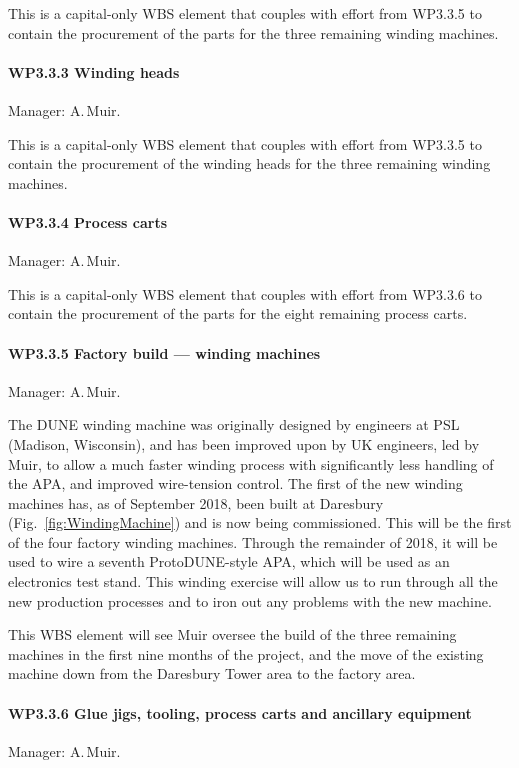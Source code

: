 This is a capital-only WBS element that couples with effort from WP3.3.5 to contain the procurement of the parts for the three remaining winding machines.

\paragraph{WP3.3.3 Winding heads} Manager: A.\,Muir.

This is a capital-only WBS element that couples with effort from WP3.3.5 to contain the procurement of the winding heads for the three remaining winding machines.

\paragraph{WP3.3.4 Process carts} Manager: A.\,Muir.

This is a capital-only WBS element that couples with effort from WP3.3.6 to contain the procurement of the parts for the eight remaining process carts.

\paragraph{WP3.3.5 Factory build --- winding machines} Manager: A.\,Muir.

The DUNE winding machine was originally designed by engineers at PSL (Madison, Wisconsin), and has been improved upon by UK engineers, led by Muir, to allow a much faster winding process with significantly less handling of the APA, and improved wire-tension control. The first of the new winding machines has, as of September 2018, been built at Daresbury (Fig.~\ref{fig:WindingMachine}) and is now being commissioned. This will be the first of the four factory winding machines. Through the remainder of 2018, it will be used to wire a seventh ProtoDUNE-style APA, which will be used as an electronics test stand. This winding exercise will allow us to run through all the new production processes and to iron out any problems with the new machine.

This WBS element will see Muir oversee the build of the three remaining machines in the first nine months of the project, and the move of the existing machine down from the Daresbury Tower area to the factory area.

\paragraph{WP3.3.6 Glue jigs, tooling, process carts and ancillary equipment} Manager: A.\,Muir.

